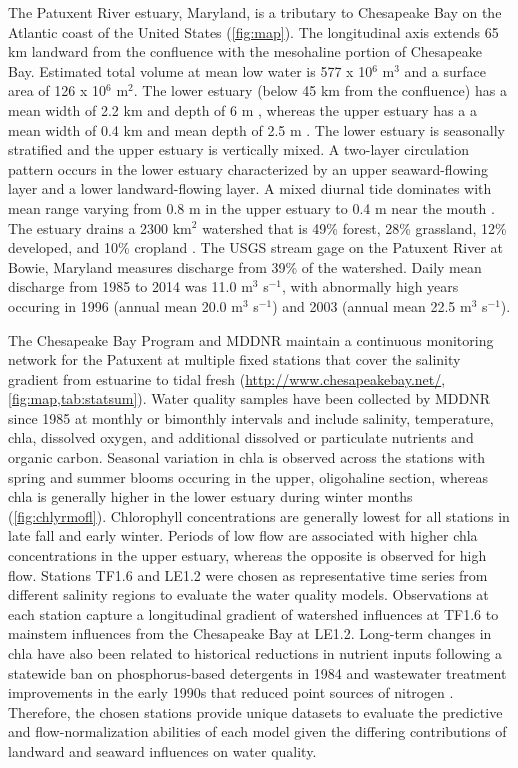 \documentclass[letterpaper,12pt,oneside]{article}\usepackage[]{graphicx}\usepackage[]{color}
\begin{document}
The Patuxent River estuary, Maryland, is a tributary to Chesapeake Bay on the Atlantic coast of the United States (\cref{fig:map}). The longitudinal axis extends 65 km landward from the confluence with the mesohaline portion of Chesapeake Bay.  Estimated total volume at mean low water is 577 x 10$^6$ m$^3$ and a surface area of 126 x 10$^6$ m$^2$.  The lower estuary (below 45 km from the confluence) has a mean width of 2.2 km and depth of 6 m \citep{Cronin75}, whereas the upper estuary has a a mean width of 0.4 km and mean depth of 2.5 m \citep{Hagythes}.  The lower estuary is seasonally stratified and the upper estuary is vertically mixed.  A two-layer circulation pattern occurs in the lower estuary characterized by an upper seaward-flowing layer and a lower landward-flowing layer.  A mixed diurnal tide dominates with mean range varying from 0.8 m in the upper estuary to 0.4 m near the mouth \citep{Boicourt98}.  The estuary drains a 2300 km$^2$ watershed that is 49\% forest, 28\% grassland, 12\% developed, and 10\% cropland \citep{Jordan03}.  The \ac{USGS} stream gage on the Patuxent River at Bowie, Maryland measures discharge from 39\% of the watershed.  Daily mean discharge from 1985 to 2014 was 11.0 m$^3$ s$^{-1}$, with abnormally high years occuring in 1996 (annual mean 20.0 m$^3$ s$^{-1}$) and 2003 (annual mean 22.5  m$^3$ s$^{-1}$). 

The Chesapeake Bay Program and \ac{MDDNR} maintain a continuous monitoring network for the Patuxent at multiple fixed stations that cover the salinity gradient from estuarine to tidal fresh (\href{http://www.chesapeakebay.net/}{http://www.chesapeakebay.net/}, \cref{fig:map,tab:statsum}).  Water quality samples have been collected by \ac{MDDNR} since 1985 at monthly or bimonthly intervals and include salinity, temperature, \ac{chla}, dissolved oxygen, and additional dissolved or particulate nutrients and organic carbon.  Seasonal variation in \ac{chla} is observed across the stations with spring and summer blooms occuring in the upper, oligohaline section, whereas \ac{chla} is generally higher in the lower estuary during winter months (\cref{fig:chlyrmofl}).  Chlorophyll concentrations are generally lowest for all stations in late fall and early winter.  Periods of low flow are associated with higher \ac{chla} concentrations in the upper estuary, whereas the opposite is observed for high flow.  Stations TF1.6 and LE1.2 were chosen as representative time series from different salinity regions to evaluate the water quality models.  Observations at each station capture a longitudinal gradient of watershed influences at TF1.6 to mainstem influences from the Chesapeake Bay at LE1.2.  Long-term changes in \ac{chla} have also been related to historical reductions in nutrient inputs following a statewide ban on phosphorus-based detergents in 1984 and wastewater treatment improvements in the early 1990s that reduced point sources of nitrogen \citep{Lung03,Testa08a}.  Therefore, the chosen stations provide unique datasets to evaluate the predictive and flow-normalization abilities of each model given the differing contributions of landward and seaward influences on water quality.
\end{document}
